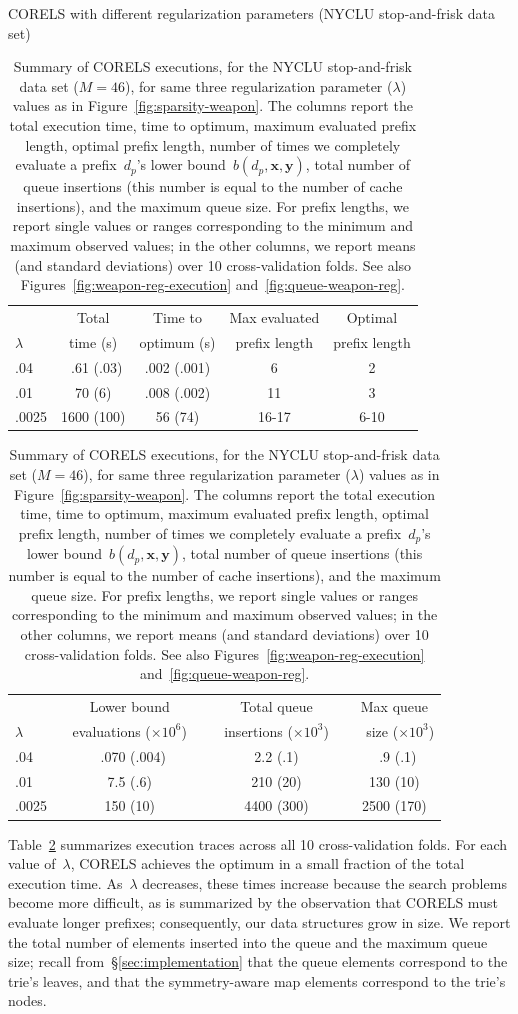 \documentclass[twoside,11pt]{article}
\newcommand{\x}{\mathbf{x}}
\newcommand{\y}{\mathbf{y}}
\def\Prefix{d_p}
\def\Reg{{\lambda}}
\begin{document}
\begin{table}[t!]
\centering
CORELS with different regularization parameters (NYCLU stop-and-frisk data set) \\
\vspace{2mm}
\begin{tabular}{l | c | c | c | c}
& Total & Time to & Max evaluated & Optimal \\
$\lambda$ & time (s) & optimum (s) & prefix length & prefix length \\
\hline
.04 & ~.61 (.03) & .002 (.001) & 6 & 2 \\
.01 & 70 (6) & .008 (.002) & 11 & 3 \\
.0025 & 1600 (100) & 56 (74) & 16-17 & 6-10 \\
\hline
\end{tabular}
\begin{tabular}{l | c | c | c}
\hline
& Lower bound & Total queue &  Max queue \\
$\lambda$ &~ evaluations ($\times 10^6$) ~&~ insertions ($\times 10^3$) ~&~ size ($\times 10^3$) \\
\hline
.04 & ~.070 (.004) & 2.2 (.1) & ~.9 (.1) \\
.01 & 7.5 (.6) & 210 (20) & 130 (10) \\
.0025 & 150 (10) & 4400 (300) & 2500 (170) \\
\end{tabular}
\caption{Summary of CORELS executions, for the NYCLU stop-and-frisk data set (${M = 46}$),
for same three regularization parameter ($\Reg$) values as in Figure~\ref{fig:sparsity-weapon}.
%
The columns report the total execution time,
time to optimum, maximum evaluated prefix length, optimal prefix length,
number of times we completely evaluate a prefix~$\Prefix$'s lower bound~$b(\Prefix, \x, \y)$,
total number of queue insertions (this number is equal to the number of cache insertions),
and the maximum queue size.
%
For prefix lengths, we report single values or ranges corresponding to the minimum and maximum observed values;
in the other columns, we report means (and standard deviations) over 10 cross-validation folds.
%
See also Figures~\ref{fig:weapon-reg-execution} and~\ref{fig:queue-weapon-reg}.
}
\vspace{4mm}
\label{tab:weapon-reg}
\end{table}

Table~\ref{tab:weapon-reg} summarizes execution traces across all 10 cross-validation folds.
%
For each value of~$\Reg$, CORELS achieves the optimum in a small fraction of the total execution time.
%
As~$\Reg$ decreases, these times increase because the search problems become more difficult,
as is summarized by the observation that CORELS must evaluate longer prefixes;
consequently, our data structures grow in size.
%
We report the total number of elements inserted into the queue and the maximum queue size;
recall from~\S\ref{sec:implementation} that the queue elements correspond to the trie's leaves,
and that the symmetry-aware map elements correspond to the trie's nodes.
\end{document}

